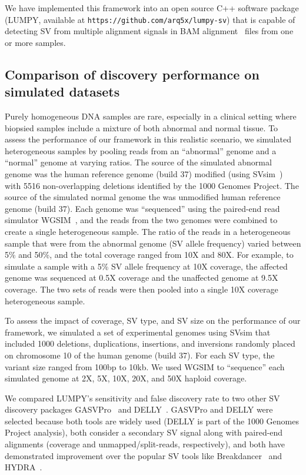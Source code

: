 \documentclass[10pt]{bmc_article}
\newenvironment{bmcformat}{\begin{raggedright}\baselineskip20pt\sloppy\setboolean{publ}{false}}{\end{raggedright}\baselineskip20pt\sloppy}
\begin{document}
\begin{bmcformat}
We have implemented this framework into an open source C++ software package
(LUMPY, available at {\tt https://github.com/arq5x/lumpy-sv})
that is capable of detecting SV from multiple alignment signals in BAM
alignment~\cite{li2009b} files from one or more samples. 

\subsection*{Comparison of discovery performance on simulated datasets}
Purely homogeneous DNA samples are rare, especially in a clinical setting where
biopsied samples include a mixture of both abnormal and normal tissue.  To
assess the performance of our framework in this realistic scenario, we simulated
heterogeneous samples by pooling reads from an ``abnormal'' genome and a
``normal'' genome at varying ratios.  The source of the simulated abnormal
genome was the human reference genome (build 37) modified (using
SVsim~\cite{faustunpub}) with 5516 non-overlapping deletions identified by the
1000 Genomes Project.  The  source of the simulated normal genome the was
unmodified human reference genome (build 37).  Each genome was ``sequenced''
using the paired-end read simulator WGSIM~\cite{liunpub}, and the reads from
the two genomes were combined to create a single heterogeneous sample.  The
ratio of the reads in a heterogeneous sample that were from the abnormal genome
(SV allele frequency) varied between 5\% and 50\%, and the total coverage ranged
from 10X and 80X.  For example, to simulate a sample with a 5\% SV allele
frequency at 10X coverage, the affected genome was sequenced at 0.5X coverage
and the unaffected genome at 9.5X coverage.  The two sets of reads were then
pooled into a single 10X coverage heterogeneous sample.

To assess the impact of coverage, SV type, and SV size on the performance of
our framework, we simulated a set of experimental genomes using SVsim that
included 1000 deletions, duplications, insertions, and inversions randomly
placed on chromosome 10 of the human genome (build 37).  For each SV type, 
the variant size ranged from 100bp to 10kb.  We used WGSIM to ``sequence'' each
simulated genome at 2X, 5X, 10X, 20X, and 50X haploid coverage.  

We compared LUMPY’s sensitivity and false discovery rate to two other SV
discovery packages GASVPro~\cite{sindi2012} and DELLY~\cite{rausch2012b}.
GASVPro and DELLY were selected because both tools are widely used (DELLY is
part of the 1000 Genomes Project analysis), both consider a secondary SV signal
along with paired-end alignments (coverage and unmapped/split-reads,
respectively), and both have demonstrated improvement over the popular SV tools
like Breakdancer~\cite{chen2009} and HYDRA~\cite{quinlan2010b}. 


\end{bmcformat}
\end{document}
